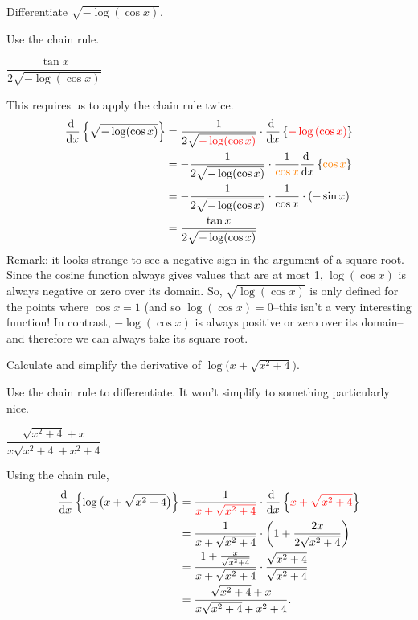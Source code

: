 \begin{question}[2015Q]
 Differentiate $\sqrt{-\log(\cos x)}$.
\end{question}
\begin{hint} Use the chain rule.
\end{hint}
\begin{answer} $\dfrac{\tan x}{2\sqrt{-\log(\cos x)}}$
\end{answer}
\begin{solution}
This requires us to apply the chain rule twice.
\begin{align*}
  \diff{}{x} \left\{ \sqrt{-\log(\cos x)} \right\}
  &= \frac{1}{2\sqrt{\textcolor{red}{-\log(\cos x)}}} \cdot \diff{}{x} \left\{ \textcolor{red}{-\log\left(\cos x\right)} \right\}\\
  &= -\frac{1}{2\sqrt{-\log(\cos x)}} \cdot \frac{1}{\textcolor{orange}{\cos x}} \diff{}{x} \left\{\textcolor{orange}{\cos x} \right\}\\
  &= -\frac{1}{2\sqrt{-\log(\cos x)}} \cdot \frac{1}{\cos x} \cdot \left(-\sin x\right)\\
  &=\frac{\tan x}{2\sqrt{-\log(\cos x)}}
\end{align*}
Remark: it looks strange to see a negative sign in the argument of a square root. Since the cosine function always gives values that are at  most 1, $\log(\cos x)$ is always negative or zero over its domain.
So, $\sqrt{\log(\cos x)}$ is only defined for the points where $\cos x=1$ (and so $\log(\cos x) = 0$--this isn't a very interesting function!
In contrast, $-\log(\cos x)$ is always positive or zero over its domain--and therefore we can always take its square root.
\end{solution}


\begin{question}[1999H]
Calculate and simplify the derivative of
$\log\big(x+\sqrt{x^2+4}\big)$.
\end{question}
\begin{hint}
Use the chain rule to differentiate. It won't simplify to something particularly nice.
\end{hint}
\begin{answer} $\dfrac{\sqrt{x^2+4}+x}{x\sqrt{x^2+4}+x^2+4}$
\end{answer}
\begin{solution}
Using the chain rule,
\begin{align*}
\diff{}{x}\left\{\log\big(x+\sqrt{x^2+4}\big)\right\}
&=\frac{1}{\textcolor{red}{x+\sqrt{x^2+4}}} \cdot \diff{}{x}\left\{\textcolor{red}{x+\sqrt{x^2+4}}\right\}
\\
&=\frac{1}{x+\sqrt{x^2+4}}\cdot\left(1+\frac{2x}{2\sqrt{x^2+4}}\right)\\
&=\frac{1+\frac{x}{\sqrt{x^2+4}}}{x+\sqrt{x^2+4}}\cdot \frac{\sqrt{x^2+4}}{\sqrt{x^2+4}}\\
&=\frac{\sqrt{x^2+4}+x}{x\sqrt{x^2+4}+x^2+4} .
\end{align*}
\end{solution}


